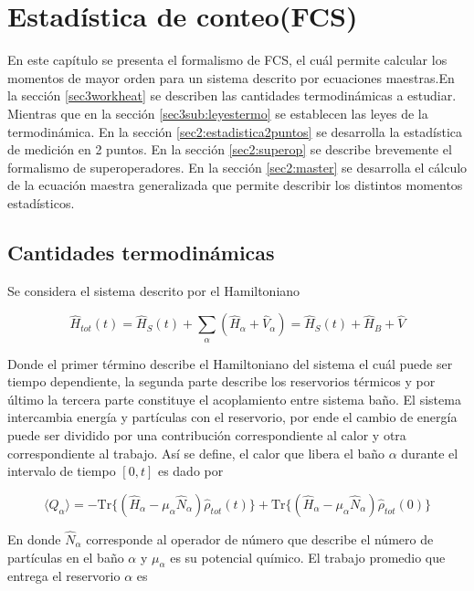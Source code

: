 \label{sec:lindblad}


\chapter{Estadística de conteo(FCS)}
En este capítulo se presenta el formalismo de FCS, el cuál permite calcular los momentos de mayor orden para un sistema descrito por ecuaciones maestras.En la sección \ref{sec3workheat} se describen las cantidades termodinámicas a estudiar. Mientras que en la sección \ref{sec3sub:leyestermo} se establecen las leyes de la termodinámica. En la sección \ref{sec2:estadistica2puntos} se desarrolla la estadística de medición en 2 puntos. En la sección \ref{sec2:superop} se describe brevemente el formalismo de superoperadores. En la sección \ref{sec2:master} se desarrolla el cálculo de la ecuación maestra generalizada que permite describir los distintos momentos estadísticos. 

\section{Cantidades termodinámicas}
Se considera el sistema descrito por el Hamiltoniano

\begin{equation*}
    \hat{H}_{tot}(t) = \hat{H}_{S}(t) + \sum_{\alpha}(\hat{H}_{\alpha} + \hat{V}_{\alpha})  = \hat{H}_{S}(t) + \hat{H}_{B} + \hat{V}
\end{equation*}

Donde el primer término describe el Hamiltoniano del sistema el cuál puede ser tiempo dependiente, la segunda parte describe los reservorios térmicos y por último la tercera parte constituye el acoplamiento entre sistema baño. El sistema intercambia energía y partículas con el reservorio, por ende el cambio de energía puede ser dividido por una contribución correspondiente al calor y otra correspondiente al trabajo. Así se define, el calor que libera el baño $\alpha$ durante el intervalo de tiempo $[0,t]$ es dado por

\begin{equation*}
    \langle Q_{\alpha}\rangle = - \text{Tr}\{(\hat{H}_{\alpha} - \mu_{\alpha}\hat{N}_{\alpha})\hat{\rho}_{tot}(t) \} + \text{Tr}\{(\hat{H}_{\alpha} - \mu_{\alpha}\hat{N}_{\alpha})\hat{\rho}_{tot}(0) \}
\end{equation*}

En donde $\hat{N}_{\alpha}$ corresponde al operador de número que describe el número de partículas en el baño $\alpha$ y $\mu_{\alpha}$ es su potencial químico. El trabajo promedio que entrega el reservorio $\alpha$ es

